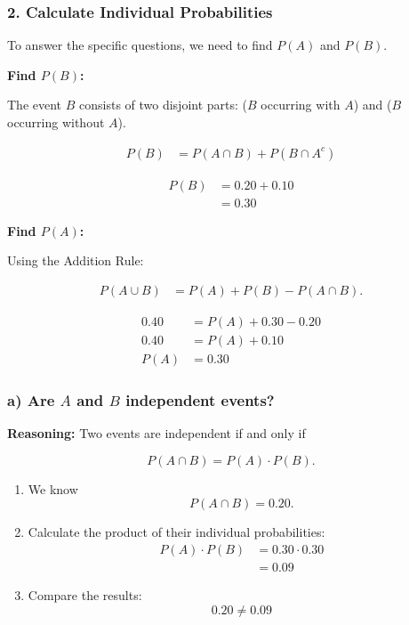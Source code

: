 \documentclass[10pt]{article}
\begin{document}
\subsubsection*{2. Calculate Individual Probabilities}
To answer the specific questions, we need to find
$P(A)$ and $P(B)$.

\textbf{Find $P(B)$:}

The event $B$ consists of two disjoint parts:
($B$ occurring with $A$) and ($B$ occurring without $A$).

\begin{align*}
P(B)
&= P(A \cap B)
   + P(B \cap A^c)
\end{align*}

\begin{align*}
P(B)
&= 0.20+0.10 \\[2mm]
&= 0.30
\end{align*}

\textbf{Find $P(A)$:}

Using the Addition Rule:

\begin{align*}
P(A \cup B)
&= P(A)+P(B)-P(A \cap B).
\end{align*}

\begin{align*}
0.40
&= P(A)+0.30-0.20 \\[2mm]
0.40
&= P(A)+0.10 \\[2mm]
P(A)
&= 0.30
\end{align*}

\subsubsection*{a) Are $A$ and $B$ independent events?}
\textbf{Reasoning:}
Two events are independent if and only if

\[
P(A \cap B)=P(A)\cdot P(B).
\]

\begin{enumerate}
\item We know
\[
P(A \cap B)=0.20.
\]

\item Calculate the product of their individual probabilities:
\begin{align*}
P(A)\cdot P(B)
&= 0.30 \cdot 0.30 \\[2mm]
&= 0.09
\end{align*}

\item Compare the results:
\[
0.20 \neq 0.09
\]
\end{enumerate}
\end{document}
